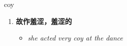 
\begin{frame}
{\huge coy}
\begin{center}
\begin{enumerate}\Large
  \item \textbf{故作羞涩，羞涩的}
  \begin{itemize}
    \item \em{\Large{she acted very coy at the dance}}
  \end{itemize}
\end{enumerate}
\end{center}
\end{frame}
